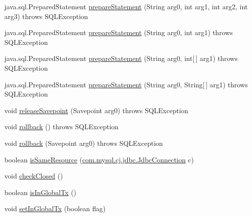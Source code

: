 \begin{DoxyCompactItemize}
\item 
java.\+sql.\+Prepared\+Statement \mbox{\hyperlink{classcom_1_1mysql_1_1cj_1_1jdbc_1_1_connection_wrapper_ae98cd37ee7c93be928a65e6bd7cde091}{prepare\+Statement}} (String arg0, int arg1, int arg2, int arg3)  throws S\+Q\+L\+Exception 
\item 
java.\+sql.\+Prepared\+Statement \mbox{\hyperlink{classcom_1_1mysql_1_1cj_1_1jdbc_1_1_connection_wrapper_a3a841e566b2d041242b0fefe178c87c1}{prepare\+Statement}} (String arg0, int arg1)  throws S\+Q\+L\+Exception 
\item 
java.\+sql.\+Prepared\+Statement \mbox{\hyperlink{classcom_1_1mysql_1_1cj_1_1jdbc_1_1_connection_wrapper_a933a2f7a3efc351d595b64a74216d473}{prepare\+Statement}} (String arg0, int\mbox{[}$\,$\mbox{]} arg1)  throws S\+Q\+L\+Exception 
\item 
java.\+sql.\+Prepared\+Statement \mbox{\hyperlink{classcom_1_1mysql_1_1cj_1_1jdbc_1_1_connection_wrapper_ad6c4ba01252963816830370b200568fe}{prepare\+Statement}} (String arg0, String\mbox{[}$\,$\mbox{]} arg1)  throws S\+Q\+L\+Exception 
\item 
void \mbox{\hyperlink{classcom_1_1mysql_1_1cj_1_1jdbc_1_1_connection_wrapper_a9d10ffe3fb8bf01464f4ef55c1eb936d}{release\+Savepoint}} (Savepoint arg0)  throws S\+Q\+L\+Exception 
\item 
void \mbox{\hyperlink{classcom_1_1mysql_1_1cj_1_1jdbc_1_1_connection_wrapper_ad25f41ed3814457e349bdf1663425ac2}{rollback}} ()  throws S\+Q\+L\+Exception 
\item 
void \mbox{\hyperlink{classcom_1_1mysql_1_1cj_1_1jdbc_1_1_connection_wrapper_a279d20acb7eddf24fa3fa690e45a751d}{rollback}} (Savepoint arg0)  throws S\+Q\+L\+Exception 
\item 
boolean \mbox{\hyperlink{classcom_1_1mysql_1_1cj_1_1jdbc_1_1_connection_wrapper_acd74fbc5622af14b9cc8e7da8aba5d7a}{is\+Same\+Resource}} (\mbox{\hyperlink{interfacecom_1_1mysql_1_1cj_1_1jdbc_1_1_jdbc_connection}{com.\+mysql.\+cj.\+jdbc.\+Jdbc\+Connection}} c)
\item 
void \mbox{\hyperlink{classcom_1_1mysql_1_1cj_1_1jdbc_1_1_connection_wrapper_a071813afb9b56c08fa663b1d429c8def}{check\+Closed}} ()
\item 
boolean \mbox{\hyperlink{classcom_1_1mysql_1_1cj_1_1jdbc_1_1_connection_wrapper_a939c7730de2849e54b9b121adb1cdaa3}{is\+In\+Global\+Tx}} ()
\item 
void \mbox{\hyperlink{classcom_1_1mysql_1_1cj_1_1jdbc_1_1_connection_wrapper_adb320c4558060ee9dae32dc4d4310beb}{set\+In\+Global\+Tx}} (boolean flag)

\end{DoxyCompactItemize}
